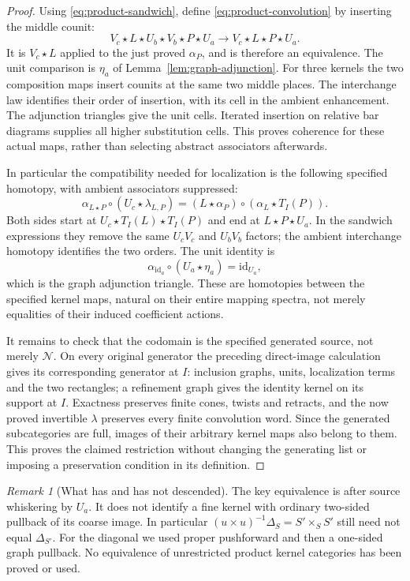 \documentclass[11pt]{article}
\theoremstyle{definition}
\theoremstyle{remark}
\newtheorem{remark}[proposition]{Remark}
\begin{document}
\begin{proof}
Using \eqref{eq:product-sandwich}, define \eqref{eq:product-convolution}
by inserting the middle counit:
\[
 V_c\star L\star U_b\star V_b\star P\star U_a
       \longrightarrow V_c\star L\star P\star U_a.
\]
It is $V_c\star L$ applied to the just proved $\alpha_P$, and is
therefore an equivalence.  The unit comparison is $\eta_a$ of
Lemma~\ref{lem:graph-adjunction}.  For three kernels the two
composition maps insert counits at the same two middle places.
The interchange law identifies their order of insertion, with its
cell in the ambient enhancement.  The adjunction triangles give the
unit cells.  Iterated insertion on relative bar diagrams supplies
all higher substitution cells.  This proves coherence for these
actual maps, rather than selecting abstract associators afterwards.

In particular the compatibility needed for localization is the
following specified homotopy, with ambient associators suppressed:
\begin{equation}
 \alpha_{L\star P}\circ(U_c\star\lambda_{L,P})
   =(L\star\alpha_P)\circ(\alpha_L\star T_I(P)).
 \label{eq:descent-pseudonaturality}
\end{equation}
Both sides start at $U_c\star T_I(L)\star T_I(P)$ and end at
$L\star P\star U_a$.  In the sandwich expressions they remove the
same $U_cV_c$ and $U_bV_b$ factors; the ambient interchange homotopy
identifies the two orders.  The unit identity is
\[
 \alpha_{\mathrm{id}_a}\circ(U_a\star\eta_a)=\mathrm{id}_{U_a},
\]
which is the graph adjunction triangle.  These are homotopies between
the specified kernel maps, natural on their entire mapping spectra,
not merely equalities of their induced coefficient actions.

It remains to check that the codomain is the specified generated
source, not merely $\mathcal N$.  On every original generator the
preceding direct-image calculation gives its corresponding generator
at $I$: inclusion graphs, units, localization terms and the two
rectangles; a refinement graph gives the identity kernel on its
support at $I$.  Exactness preserves finite cones, twists and
retracts, and the now proved invertible $\lambda$ preserves every
finite convolution word.  Since the generated subcategories are
full, images of their arbitrary kernel maps also belong to them.
This proves the claimed restriction without changing the generating
list or imposing a preservation condition in its definition.
\end{proof}

\begin{remark}[What has and has not descended]
The key equivalence is after source whiskering by $U_a$.
It does not identify a fine kernel with ordinary two-sided pullback
of its coarse image.  In particular
$(u\times u)^{-1}\Delta_S=S'\times_S S'$ still need not equal
$\Delta_{S'}$.  For the diagonal we used proper pushforward and
then a one-sided graph pullback.  No equivalence of unrestricted
product kernel categories has been proved or used.
\end{remark}
\end{document}

